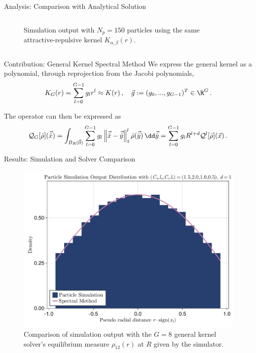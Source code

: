 \documentclass[aspectratio=169, hyperref={colorlinks=true}]{beamer}
\begin{document}
\begin{frame}{Analysis: Comparison with Analytical Solution}
\begin{columns}[t]
\begin{column}{0.4\textwidth}
\begin{figure}[H]
          \caption[Comparison with analytical solutions and error]{Simulation output with $N_p = 150$ particles using the same attractive-repulsive kernel $K_{\alpha,\beta}(r)$.}
        \end{figure}
      \end{column}
    \end{columns}
  \end{frame}

  \begin{frame}{Contribution: General Kernel Spectral Method}
    We express the general kernel as a polynomial, through reprojection from the Jacobi polynomials,
    \begin{equation}
      K_G(r) = \sum_{l=0}^{G-1} g_l r^l \approx K(r)\,,\quad \vec{g} := ({g}_0, ..., {g}_{G-1})^T \in \R^G\,.
      \label{eq:monomial-expansion}
    \end{equation}

    The operator can then be expressed as
    \begin{equation*}
      \mathcal{Q}_G[\hat{\rho}](\hatvec{x})
      = \int_{B_R(\vec{0})} \sum_{l=0}^{G-1} g_l \norm{\hatvec{x}-\hatvec{y}}^l \hat{\rho}(\hatvec{y}) \,\dd\hatvec{y}
      = \sum_{l=0}^{G-1} g_l R^{l+d} \mathcal{Q}^l[\hat{\rho}](\vec{x})\,.
    \end{equation*}
  \end{frame}

  \begin{frame}{Results: Simulation and Solver Comparison}
    \begin{figure}[H]
      \centering
      \includegraphics[width=0.58\linewidth]{results/morse/simulation-solver-comparison.pdf}
      \caption[Comparison of histogram and spectral method solution]{Comparison of simulation output with the $G = 8$ general kernel solver's equilibrium measure $\rho_{12}(r)$ at $R$ given by the simulator.}
      \label{fig:simulation-solver-comparison}
    \end{figure}
  \end{frame}
\end{document}
